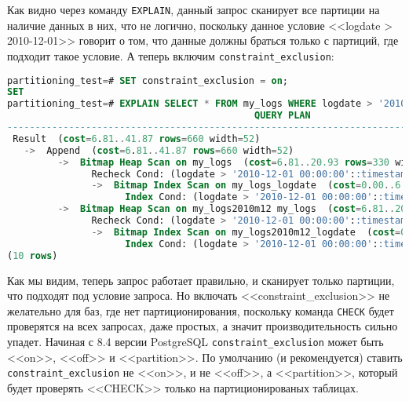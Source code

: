Как видно через команду \lstinline!EXPLAIN!, данный запрос сканирует все партиции на наличие данных в них, что не логично, поскольку данное условие <<logdate > 2010-12-01>> говорит о том, что данные должны браться только с партиций, где подходит такое условие. А теперь включим \lstinline!constraint_exclusion!:

\begin{lstlisting}[language=SQL,label=lst:partitioning15,caption=<<constraint\_exclusion>> ON]
partitioning_test=# SET constraint_exclusion = on;
SET
partitioning_test=# EXPLAIN SELECT * FROM my_logs WHERE logdate > '2010-12-01';
                                            QUERY PLAN
---------------------------------------------------------------------------------------------------
 Result  (cost=6.81..41.87 rows=660 width=52)
   ->  Append  (cost=6.81..41.87 rows=660 width=52)
         ->  Bitmap Heap Scan on my_logs  (cost=6.81..20.93 rows=330 width=52)
               Recheck Cond: (logdate > '2010-12-01 00:00:00'::timestamp without time zone)
               ->  Bitmap Index Scan on my_logs_logdate  (cost=0.00..6.73 rows=330 width=0)
                     Index Cond: (logdate > '2010-12-01 00:00:00'::timestamp without time zone)
         ->  Bitmap Heap Scan on my_logs2010m12 my_logs  (cost=6.81..20.93 rows=330 width=52)
               Recheck Cond: (logdate > '2010-12-01 00:00:00'::timestamp without time zone)
               ->  Bitmap Index Scan on my_logs2010m12_logdate  (cost=0.00..6.73 rows=330 width=0)
                     Index Cond: (logdate > '2010-12-01 00:00:00'::timestamp without time zone)
(10 rows)
\end{lstlisting}

Как мы видим, теперь запрос работает правильно, и сканирует только партиции, что подходят под условие запроса. Но включать <<constraint\_exclusion>> не желательно для баз, где нет партиционирования, поскольку команда \lstinline!CHECK! будет проверятся на всех запросах, даже простых, а значит производительность сильно упадет. Начиная с 8.4 версии PostgreSQL \lstinline!constraint_exclusion! может быть <<on>>, <<off>> и <<partition>>. По умолчанию (и рекомендуется) ставить \lstinline!constraint_exclusion! не <<on>>, и не <<off>>, а <<partition>>, который будет проверять <<CHECK>> только на партиционированых таблицах.
